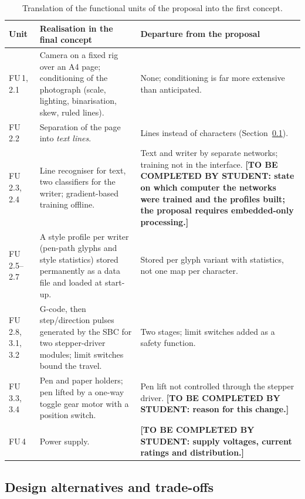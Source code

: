 \begin{table}[htbp]
\centering
\fontsize{9}{10.5}\selectfont
\begin{tabularx}{\linewidth}{|p{1.5cm}|X|X|}
\hline
\textbf{Unit} & \textbf{Realisation in the final concept} & \textbf{Departure from the proposal} \\
\hline
FU\,1, 2.1 & Camera on a fixed rig over an A4 page; conditioning of the photograph (scale, lighting, binarisation, skew, ruled lines). & None; conditioning is far more extensive than anticipated. \\
\hline
FU\,2.2 & Separation of the page into \emph{text lines}. & Lines instead of characters (Section~\ref{sec:app-alternatives}). \\
\hline
FU\,2.3, 2.4 & Line recogniser for text, two classifiers for the writer; gradient-based training offline. & Text and writer by separate networks; training not in the interface. \textbf{[TO BE COMPLETED BY STUDENT: state on which computer the networks were trained and the profiles built; the proposal requires embedded-only processing.]} \\
\hline
FU\,2.5--2.7 & A style profile per writer (pen-path glyphs and style statistics) stored permanently as a data file and loaded at start-up. & Stored per glyph variant with statistics, not one map per character. \\
\hline
FU\,2.8, 3.1, 3.2 & G-code, then step/direction pulses generated by the SBC for two stepper-driver modules; limit switches bound the travel. & Two stages; limit switches added as a safety function. \\
\hline
FU\,3.3, 3.4 & Pen and paper holders; pen lifted by a one-way toggle gear motor with a position switch. & Pen lift not controlled through the stepper driver. \textbf{[TO BE COMPLETED BY STUDENT: reason for this change.]} \\
\hline
FU\,4 & Power supply. & \textbf{[TO BE COMPLETED BY STUDENT: supply voltages, current ratings and distribution.]} \\
\hline
\end{tabularx}
\caption{Translation of the functional units of the proposal into the first concept.}
\label{tab:app-fu}
\end{table}

\subsection{Design alternatives and trade-offs}
\label{sec:app-alternatives}

